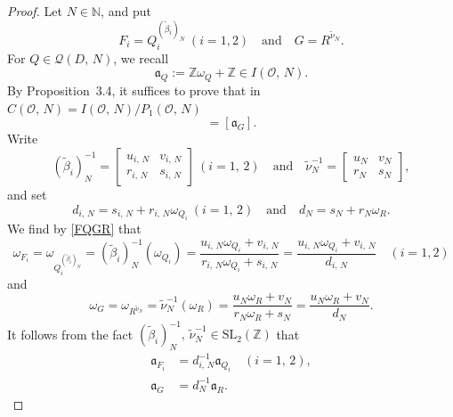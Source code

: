 \documentclass[reqno,11pt]{article}
\theoremstyle{plain} %
\theoremstyle{definition} %
\begin{document}
\begin{proof}
Let $N\in\mathbb N$, and put
\begin{equation}\label{FQGR}
 F_i=Q_i^{(\widetilde{\beta}_i)_N}~
(i=1,2)\quad\textrm{and}\quad
 G=R^{\widetilde{\nu}_N}.
\end{equation}
For $Q\in\mathcal{Q}(D,\,N)$, we recall
\begin{equation*}
\mathfrak{a}_Q:=\mathbb Z\omega_Q+\mathbb Z\in I(\mathcal{O},\,N). 
\end{equation*}
By Proposition~3.4, it suffices to prove that in $C(\mathcal{O},\,N)=I(\mathcal{O},\,N)/P_1(\mathcal{O},\,N)$
\begin{equation*}
[\mathfrak{a}_{F_1}\mathfrak a_{F_2}]=
[\mathfrak{a}_G].
\end{equation*}
Write
\begin{equation*}
(\widetilde{\beta}_i)_N^{-1}
=\begin{bmatrix}
u_{i,\,N} & v_{i,\,N}\\
r_{i,\,N} & s_{i,\,N}
\end{bmatrix}~(i=1,\,2)
\quad\textrm{and}\quad
\widetilde{\nu}_N^{-1}
=\begin{bmatrix}u_N & v_N\\r_N & s_N
\end{bmatrix},
\end{equation*}
and set
\begin{equation*}
d_{i,\,N}=s_{i,\,N}+r_{i,\,N}\omega_{Q_i}
~(i=1,\,2)\quad\textrm{and}\quad d_N=s_N+r_N\omega_R.
\end{equation*}
We find by \eqref{FQGR} that
\begin{equation*}
\omega_{F_i}=\omega_{Q_i^{(\widetilde{\beta}_i)_N}}=
(\widetilde{\beta}_i)_N^{-1}(\omega_{Q_i})=
\frac{u_{i,\,N}\omega_{Q_i}+v_{i,\,N}}
{r_{i,\,N}\omega_{Q_i}+s_{i,\,N}}=
\frac{u_{i,\,N}\omega_{Q_i}+v_{i,\,N}}
{d_{i,\,N}}
 \quad (i=1,2)
\end{equation*}
and
\begin{equation*}
\omega_G=\omega_{R^{\widetilde{\nu}_N}}=
\widetilde{\nu}_N^{-1}(\omega_R)=
\frac{u_N\omega_R+v_N}{r_N\omega_R+s_N}=
\frac{u_N\omega_R+v_N}{d_N}.
\end{equation*}
It follows from the fact 
$(\widetilde{\beta}_i)_N^{-1},\,\widetilde{\nu}_N^{-1}
\in\mathrm{SL}_2(\mathbb{Z})$ that
\begin{align}
\mathfrak a_{F_i}&=
d_{i,\,N}^{-1}\mathfrak{a}_{Q_i}
\quad(i=1,\,2),\label{ada}\\
\mathfrak{a}_G&=d_N^{-1}\mathfrak{a}_R.\label{ada2}
\end{align}

\end{proof}
\end{document}
